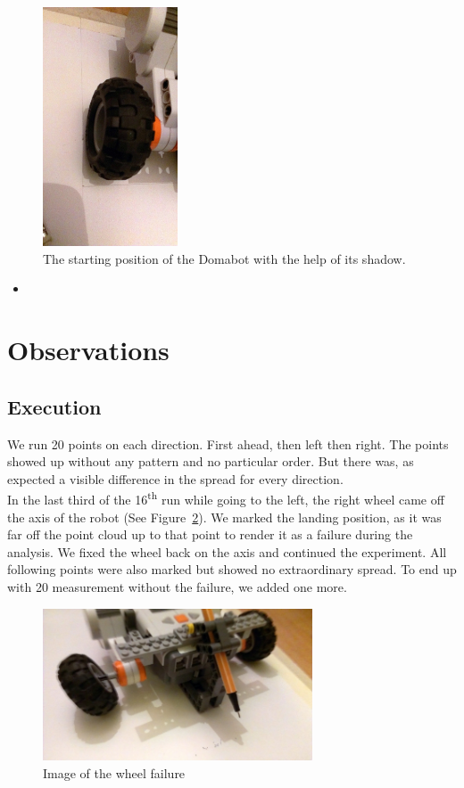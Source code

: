 \documentclass{scrartcl}
\begin{document}
\begin{figure}
 \center
 \includegraphics[width= 4cm]{img/wheel_adjust.jpg}
 \caption{The starting position of the Domabot with the help of its shadow.}
 \label{fig:setup}
\end{figure}



\begin{itemize}
\item
\end{itemize}


\section{Observations}
\subsection{Execution}

We run 20 points on each direction. First ahead, then left then right. The points showed up without any pattern and no particular order. But there was, as expected a visible difference in the spread for every direction.\\
In the last third of the 16\textsuperscript{th} run while going to the left, the right wheel came off the axis of the robot (See Figure~\ref{fig:failure}).
We marked the landing position, as it was far off the point cloud up to that point to render it as a failure during the analysis. We fixed the wheel back on the axis and continued the experiment. All following points were also marked but showed no extraordinary spread. To end up with 20 measurement without the failure, we added one more.

\begin{figure}
 \center
 \includegraphics[width= 8cm]{img/wheel_failure.jpg}
 \caption{Image of the wheel failure}
 \label{fig:failure}
\end{figure}
\end{document}
